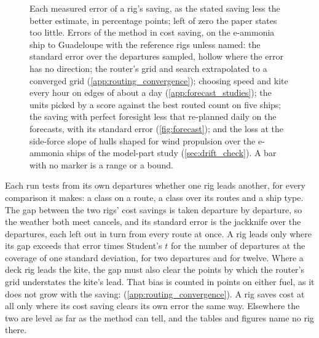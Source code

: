 \begin{figure}[tbp]
\centering
{}
\caption{  Each measured error of a rig's saving, as the stated saving less the better estimate, in percentage points; left of zero the paper states too little. Errors of the method in cost saving, on the  e-ammonia ship to Guadeloupe with the reference rigs unless named: the standard error over the  departures sampled, hollow where the error has no direction; the router's grid and search extrapolated to a converged grid (\cref{app:routing_convergence}); choosing speed and kite every hour on edges of about a day (\cref{app:forecast_studies}); the units picked by a score against the best routed count on five ships; the saving with perfect foresight less that re-planned daily on the forecasts, with its standard error (\cref{fig:forecast}); and the loss at the side-force slope of hulls shaped for wind propulsion over the e-ammonia ships of the model-part study (\cref{sec:drift_check}). A bar with no marker is a range or a bound.}
\label{fig:known_errors}
\end{figure}

Each run tests from its own departures whether one rig leads another, for every comparison it makes: a class on a route, a class over its routes and a ship type. The gap between the two rigs' cost savings is taken departure by departure, so the weather both meet cancels, and its standard error is the jackknife over the departures, each left out in turn from every route at once. A rig leads only where its gap exceeds that error times Student's $t$ for the number of departures at the coverage of one standard deviation,  for two departures and  for twelve. Where a deck rig leads the kite, the gap must also clear the \NumKiteGapBias{} points by which the router's grid understates the kite's lead. That bias is counted in points on either fuel, as it does not grow with the saving:  (\cref{app:routing_convergence}). A rig saves cost at all only where its cost saving clears its own error the same way. Elsewhere the two are level as far as the method can tell, and the tables and figures name no rig there.

